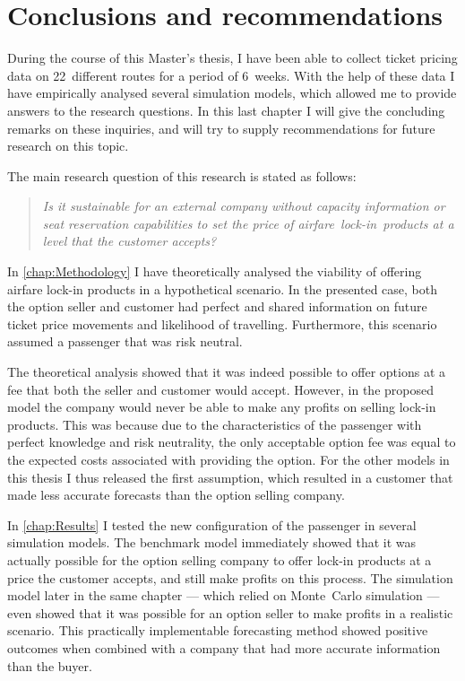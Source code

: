 \chapter{Conclusions and recommendations}

During the course of this Master's thesis, I have been able to collect ticket pricing data on 22~different routes for a period of 6~weeks. With the help of these data I have empirically analysed several simulation models, which allowed me to provide answers to the research questions. In this last chapter I will give the concluding remarks on these inquiries, and will try to supply recommendations for future research on this topic.

The main research question of this research is stated as follows:

\begin{quote}\emph{Is it sustainable for an external company without capacity information or seat reservation capabilities to set the price of airfare~lock-in~products at a level that the customer accepts?}\end{quote}

In \autoref{chap:Methodology} I have theoretically analysed the viability of offering airfare lock-in products in a hypothetical scenario. In the presented case, both the option seller and customer had perfect and shared information on future ticket price movements and likelihood of travelling. Furthermore, this scenario assumed a passenger that was risk neutral.

The theoretical analysis showed that it was indeed possible to offer options at a fee that both the seller and customer would accept. However, in the proposed model the company would never be able to make any profits on selling lock-in products. This was because due to the characteristics of the passenger with perfect knowledge and risk neutrality, the only acceptable option fee was equal to the expected costs associated with providing the option. For the other models in this thesis I thus released the first assumption, which resulted in a customer that made less accurate forecasts than the option selling company.

In \autoref{chap:Results} I tested the new configuration of the passenger in several simulation models. The benchmark model immediately showed that it was actually possible for the option selling company to offer lock-in products at a price the customer accepts, and still make profits on this process. The simulation model later in the same chapter --- which relied on Monte~Carlo simulation --- even showed that it was possible for an option seller to make profits in a realistic scenario. This practically implementable forecasting method showed positive outcomes when combined with a company that had more accurate information than the buyer.

